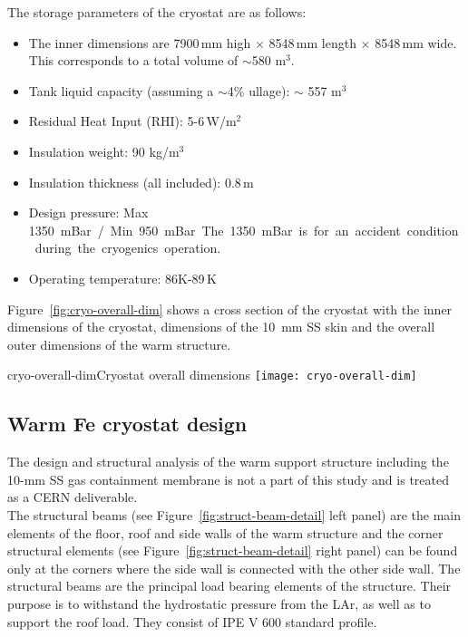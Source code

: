 The storage parameters of the cryostat are as follows:
\begin{itemize} %
\item The inner dimensions are 7900\,mm high $\times$ 8548\,mm length $\times$ 8548\,mm wide.  This corresponds to a total volume of $\sim$580 m$^3$. 
\item Tank liquid capacity (assuming a $\sim$4\% ullage): $\sim$ 557 m$^3$
\item Residual Heat Input (RHI): 5-6\,W/m$^2$
\item Insulation weight: 90 kg/m$^3$  
\item Insulation thickness (all included): 0.8\,m 
\item Design pressure: Max \SI{1350} mBar / Min 950 mBar.  The \SI{1350} mBar is for an accident condition during the cryogenics operation.
\item Operating temperature: 86K-89\,K
\end{itemize}

Figure~\ref{fig:cryo-overall-dim} shows a cross section of the cryostat with the inner dimensions of the cryostat, dimensions of the \SI{10}{mm} SS skin and the overall outer dimensions of the warm structure.

\begin{cdrfigure}{cryo-overall-dim}{Cryostat overall dimensions}
  \texttt{[image: cryo-overall-dim]}
\end{cdrfigure}

\subsection{Warm Fe cryostat design}


The design and structural analysis of the warm support structure including the 10-mm SS gas containment membrane is not a part of this study and is %
treated as a CERN deliverable. \\
%
The structural beams (see Figure~\ref{fig:struct-beam-detail} left panel) are the main elements of the floor, roof and side walls of the warm structure and the corner structural elements (see Figure~\ref{fig:struct-beam-detail} right panel) can be found only at the corners where the side wall is connected with the other side wall. The structural beams are the principal load bearing elements of the structure. Their purpose is to withstand the hydrostatic pressure from the LAr, as well as to support the roof load. They consist of IPE V 600 standard profile. 

